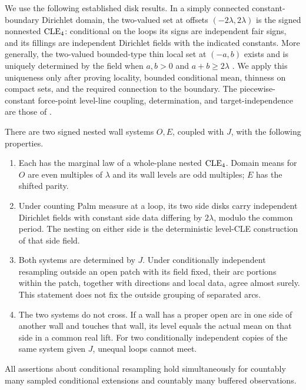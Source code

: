 We use the following established disk results.  In a simply connected constant-boundary Dirichlet domain, the two-valued set at offsets $(-2\lambda,2\lambda)$ is the signed nonnested $\mathrm{CLE}_4$: conditional on the loops its signs are independent fair signs, and its fillings are independent Dirichlet fields with the indicated constants.  More generally, the two-valued bounded-type thin local set at $(-a,b)$ exists and is uniquely determined by the field when $a,b>0$ and $a+b\ge2\lambda$ \cite[Proposition~2]{ASWlocal}.  We apply this uniqueness only after proving locality, bounded conditional mean, thinness on compact sets, and the required connection to the boundary.  The piecewise-constant force-point level-line coupling, determination, and target-independence are those of \cite[Theorems~1.1.1--1.1.3 and~1.1.7]{WangWu}.

\begin{proposition}\label{wall:local-determination}
There are two signed nested wall systems $O,E$, coupled with $J$, with the following properties.
\begin{enumerate}[label=(\roman*)]
\item Each has the marginal law of a whole-plane nested $\mathrm{CLE}_4$.  Domain means for $O$ are even multiples of $\lambda$ and its wall levels are odd multiples; $E$ has the shifted parity.
\item Under counting Palm measure at a loop, its two side disks carry independent Dirichlet fields with constant side data differing by $2\lambda$, modulo the common period.  The nesting on either side is the deterministic level-CLE construction of that side field.
\item Both systems are determined by $J$.  Under conditionally independent resampling outside an open patch with its field fixed, their arc portions within the patch, together with directions and local data, agree almost surely.  This statement does not fix the outside grouping of separated arcs.
\item The two systems do not cross.  If a wall has a proper open arc in one side of another wall and touches that wall, its level equals the actual mean on that side in a common real lift.  For two conditionally independent copies of the same system given $J$, unequal loops cannot meet.
\end{enumerate}
All assertions about conditional resampling hold simultaneously for countably many sampled conditional extensions and countably many buffered observations.
\end{proposition}

